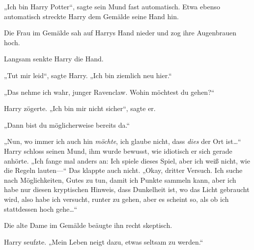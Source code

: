 „Ich bin Harry Potter“, sagte sein Mund fast automatisch. Etwa ebenso automatisch streckte Harry dem Gemälde seine Hand hin.

Die Frau im Gemälde sah auf Harrys Hand nieder und zog ihre Augenbrauen hoch.

Langsam senkte Harry die Hand.

„Tut mir leid“, sagte Harry. „Ich bin ziemlich neu hier.“

„Das nehme ich wahr, junger Ravenclaw. Wohin möchtest du gehen?“

Harry zögerte. „Ich bin mir nicht sicher“, sagte er.

„Dann bist du möglicherweise bereits da.“

„Nun, wo immer ich auch hin \emph{möchte}, ich glaube nicht, dass \emph{dies} der Ort ist…“ Harry schloss seinen Mund, ihm wurde bewusst, wie idiotisch er sich gerade anhörte. „Ich fange mal anders an: Ich spiele dieses Spiel, aber ich weiß nicht, wie die Regeln lauten—“ Das klappte auch nicht. „Okay, dritter Versuch. Ich suche nach Möglichkeiten, Gutes zu tun, damit ich Punkte sammeln kann, aber ich habe nur diesen kryptischen Hinweis, dass Dunkelheit ist, wo das Licht gebraucht wird, also habe ich versucht, runter zu gehen, aber es scheint so, als ob ich stattdessen hoch gehe…“

Die alte Dame im Gemälde beäugte ihn recht skeptisch.

Harry seufzte. „Mein Leben neigt dazu, etwas seltsam zu werden.“

